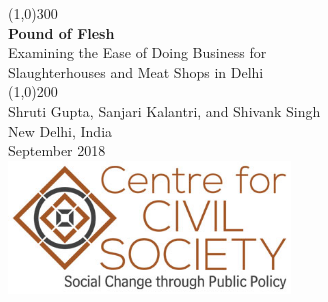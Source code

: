 \documentclass[a4paper, 12pt, twoside]{article}
\begin{document}
\begin{titlepage}
\begin{center}
\line(1,0){300}\\
[0.25in]
\huge{\bfseries \textcolor{CCSbrown} {Pound of Flesh}} \\
[0.5cm]
\large{Examining the Ease of Doing Business for \\ Slaughterhouses and Meat Shops in Delhi} \\
    	
\line(1,0){200}\\
[3in]
\LARGE{Shruti Gupta, Sanjari Kalantri, and Shivank Singh} \\ 
[1.5cm]
{\normalsize New Delhi, India} \\
{\normalsize September 2018} \\
[2cm]
\includegraphics[width = 75mm]{CCSlogo.jpg}

\end{center}
\end{titlepage}

\tableofcontents
\newpage
{}
\end{document}
